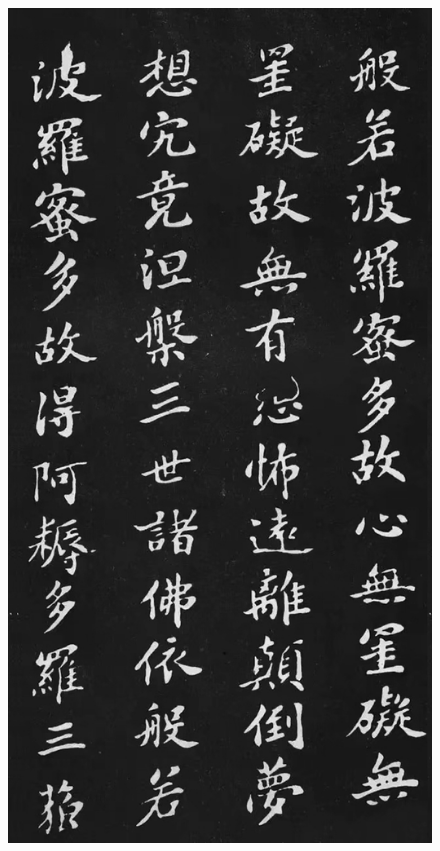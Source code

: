 \documentclass[a4paper,twoside]{article}
\begin{document}
\begin{figure}[ht]
\centering
\includegraphics[width=12.2cm]{images/sushi-4}
\end{figure}
\end{document}
